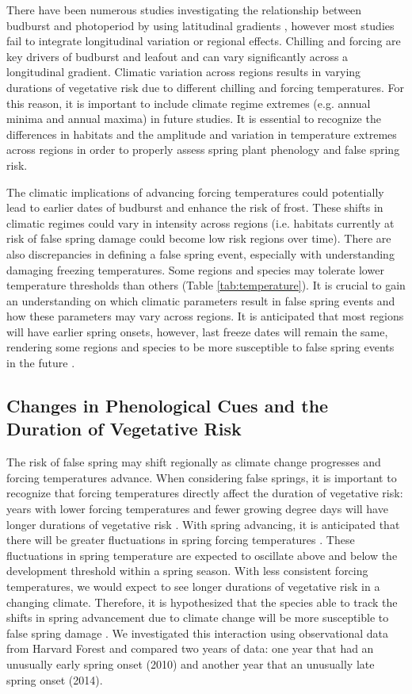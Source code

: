 \documentclass{article}\usepackage[]{graphicx}\usepackage[]{color}
\begin{document}
There have been numerous studies investigating the relationship between budburst and photoperiod by using latitudinal gradients \citep{Partanen2004, Viheraaarnio2006, Caffarra2011, Zohner2016, Gauzere2017}, however most studies fail to integrate longitudinal variation or regional effects. Chilling and forcing are key drivers of budburst and leafout and can vary significantly across a longitudinal gradient. Climatic variation across regions results in varying durations of vegetative risk due to different chilling and forcing temperatures. For this reason, it is important to include climate regime extremes (e.g. annual minima and annual maxima) in future studies. It is essential to recognize the differences in habitats and the amplitude and variation in temperature extremes across regions in order to properly assess spring plant phenology and false spring risk. 

The climatic implications of advancing forcing temperatures could potentially lead to earlier dates of budburst and enhance the risk of frost. These shifts in climatic regimes could vary in intensity across regions (i.e. habitats currently at risk of false spring damage could become low risk regions over time). There are also discrepancies in defining a false spring event, especially with understanding damaging freezing temperatures. Some regions and species may tolerate lower temperature thresholds than others (Table \ref{tab:temperature}). It is crucial to gain an understanding on which climatic parameters result in false spring events and how these parameters may vary across regions. It is anticipated that most regions will have earlier spring onsets, however, last freeze dates will remain the same, rendering some regions and species to be more susceptible to false spring events in the future \citep{Labe2016}. 

\subsection{Changes in Phenological Cues and the Duration of Vegetative Risk}
The risk of false spring may shift regionally as climate change progresses and forcing temperatures advance. When considering false springs, it is important to recognize that forcing temperatures directly affect the duration of vegetative risk: years with lower forcing temperatures and fewer growing degree days will have longer durations of vegetative risk \citep{Donnelly2017}. With spring advancing, it is anticipated that there will be greater fluctuations in spring forcing temperatures \citep{Martin2010}. These fluctuations in spring temperature are expected to oscillate above and below the development threshold within a spring season. With less consistent forcing temperatures, we would expect to see longer durations of vegetative risk in a changing climate. Therefore, it is hypothesized that the species able to track the shifts in spring advancement due to climate change will be more susceptible to false spring damage \citep{Scheifinger2003}. We investigated this interaction using observational data from Harvard Forest \citep{Okeefe2014} and compared two years of data: one year that had an unusually early spring onset (2010) and another year that an unusually late spring onset (2014).
\end{document}
